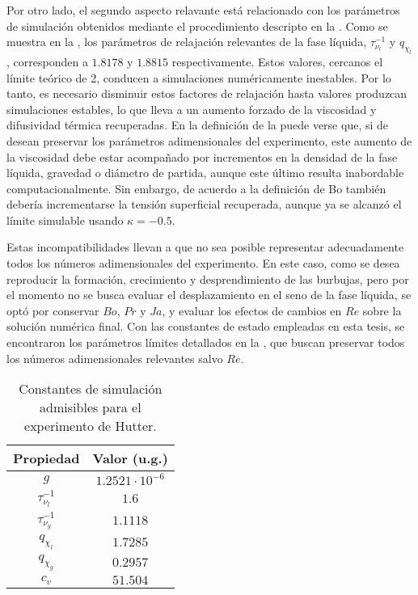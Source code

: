 Por otro lado, el segundo aspecto relavante est\'a relacionado con los par\'ametros de simulaci\'on obtenidos mediante el procedimiento descripto en la . Como se muestra en la , los par\'ametros de relajaci\'on relevantes de la fase l\'iquida, $\tau_{\nu_l}^{-1}$ y $q_{\chi_l}$, corresponden a $1.8178$ y $1.8815$ respectivamente. Estos valores, cercanos el l\'imite te\'orico de 2, conducen a simulaciones num\'ericamente inestables. Por lo tanto, es necesario disminuir estos factores de relajaci\'on hasta valores produzcan simulaciones estables, lo que lleva a un aumento forzado de la viscosidad  y difusividad t\'ermica recuperadas. En la definici\'on de la  puede verse que, si de desean preservar los par\'ametros adimensionales del experimento, este aumento de la viscosidad debe estar acompa\~nado por incrementos en la densidad de la fase l\'iquida, gravedad o di\'ametro de partida, aunque este \'ultimo resulta inabordable computacionalmente. Sin embargo, de acuerdo a la definici\'on de Bo tambi\'en deber\'ia incrementarse la tensi\'on superficial recuperada, aunque ya se alcanz\'o el l\'imite simulable usando $\kappa = -0.5$.

Estas incompatibilidades llevan a que no sea posible representar adecuadamente todos los n\'umeros adimensionales del experimento. En este caso, como se desea reproducir la formaci\'on, crecimiento y desprendimiento de las burbujas, pero por el momento no se busca evaluar el desplazamiento en el seno de la fase l\'iquida, se opt\'o por conservar $Bo$, $Pr$ y $Ja$, y evaluar los efectos de cambios en $Re$ sobre la soluci\'on num\'erica final. Con las constantes de estado empleadas en esta tesis, se encontraron los par\'ametros l\'imites detallados en la , que buscan preservar todos los n\'umeros adimensionales relevantes salvo $Re$.

\begin{table}[ht]
	\centering
    \begin{tabular}{c c}
	    \toprule
        \bf Propiedad & \bf Valor (u.g.)\\
        \midrule
		$g$ & $1.2521 \cdot 10^{-6}$\\
		$\tau_{\nu_l}^{-1}$ & $1.6$\\
		$\tau_{\nu_g}^{-1}$ & $1.1118$ \\
		$q_{\chi_l}$ & $1.7285$ \\
		$q_{\chi_g}$ & $0.2957$ \\
		$c_v$ & $51.504$ \\
        \bottomrule
	\end{tabular}
	\caption{Constantes de simulaci\'on admisibles para el experimento de Hutter. }
	\label{tab:param_sim_max}
\end{table} 
\FloatBarrier

